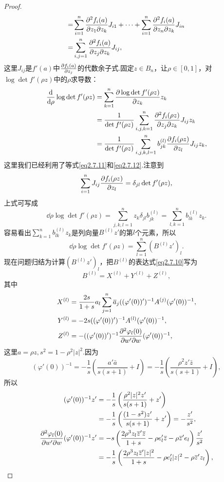 \begin{proof}
\begin{align*}
=&\sum_{i=1}^{n} \frac{\partial^2 f_i(a)}{\partial z_1\partial z_k}J_{i1}+\cdots+\sum_{i=1}^{n}\frac{\partial^2 f_i(a)}{\partial z_n\partial z_k}J_{in}\\
=&\sum_{i,j=1}^{n}\frac{\partial^2 f_i(a)}{\partial z_j\partial z_k}J_{ij},
\end{align*}
这里$J_{ij}$是$f'(a)$中$\frac{\partial f_i(a)}{\partial z_j}$的代数余子式.固定$z\in B_n$，让$\rho\in[0,1]$，对$\log\det f'(\rho z)$中的$\rho$求导数：
\begin{align*}
	\frac{\mathop{}\!\mathrm d}{\mathop{}\!\mathrm d\rho} \log\det f'(\rho z)
	&=\sum_{k=1}^{n}\frac{\partial \log\det f'(\rho z)}{\partial z_k}z_k\\
	&=\frac1{\det f'(\rho z)}\sum_{i,j,k=1}^{n}\frac{\partial^2 f_i(\rho z)}{\partial z_j\partial z_k}J_{ij}z_k\\
	&=\frac1{\det f'(\rho z)}\sum_{i,j,k,l=1}^{n}b_{jk}^{(l)}\frac{\partial f_i(\rho z)}{\partial z_l} J_{ij} z_k,
\end{align*}
这里我们已经利用了等式\eqref{eq2.7.11}和\eqref{eq2.7.12}.注意到
\[\sum_{i=1}^{n}J_{ij} \frac{\partial f_i(\rho z)}{\partial z_l}=\delta_{jl}\det f'(\rho z),\]
上式可写成
\[\dd{}{\rho}\log\det f'(\rho z)=\sum_{j,k,l=1}^{n}z_k\delta_{jl}b_{jk}^{(l)}=\sum_{l,k=1}^{n}b_{lk}^{(l)}z_k.\]
容易看出$\sum\limits_{k=1}^n b_{lk}^{(l)}z_k$是列向量$B^{(l)}z'$的第$l$个元素，所以
\begin{equation}\label{eq2.7.13}
	\dd{}{\rho}\log\det f'(\rho z)=\sum_{l=1}^{n}(B^{(l)}z')_l .
\end{equation}
现在问题归结为计算$(B^{(l)}z')_l$，把$B^{(l)}$的表达式\eqref{eq2.7.10}写为
\[B^{(l)}=X^{(l)}+Y^{(l)}+Z^{(l)},\]
其中
\begin{align*}
	X^{(l)}
	&=\frac{2s}{1+s}a_l\sum_{j=1}^{n}{}\mkern1mu\overline{\mkern-1mua}_j((\varphi'(0))')^{-1}A^{(j)}(\varphi'(0))^{-1},\\
	Y^{(l)}
	&=-2s((\varphi'(0))')^{-1}A^{(l)}(\varphi'(0))^{-1},\\
	Z^{(l)}
	&=-((\varphi'(0))')^{-1}\frac{\partial^2 \varphi_l(0)}{\partial w'\partial w}(\varphi'(0))^{-1},
\end{align*}
这里$a=\rho z,s^2=1-\rho^2|z|^2$.因为
\[(\varphi'(0))^{-1}=-\frac1s\left(\frac{a'\bar{a}}{s(s+1)}+I\right)=-\frac1s\left(\frac{\rho^2 z'\bar{z}}{s(s+1)}+I\right),\]
所以
\begin{align*}
	(\varphi'(0))^{-1}z'
	&=-\frac1s\left(\frac{\rho^2|z|^2z'}{s(s+1)}+z'\right)\\
	&=-\frac1s\left(\frac{(1-s^2)z'}{s(s+1)}+z'\right)=-\frac{z'}{s^2},\\
	\pppp{\varphi_l(0)}{w'}{w}(\varphi'(0))^{-1}z'
	&=-s\left(\frac{2\rho^3 z_l\bar{z}'\bar{z}}{1+s}-\rho e_l'\bar{z}-\rho\bar{z}'e_l\right)\frac{z'}{s^2}\\
	&=-\frac1s\left(\frac{2\rho^3 z_l\bar{z}'|z|^2}{1+s}-\rho e_l'|z|^2-\rho\bar{z}'z_l\right),

\end{align*}
\end{proof}

